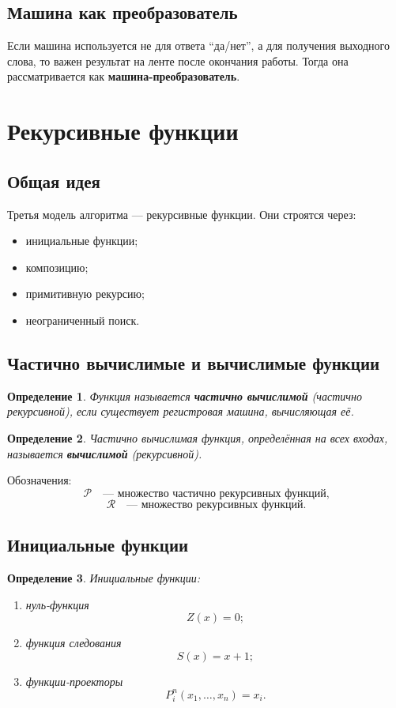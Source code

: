 \documentclass[12pt,a4paper]{article}
\newtheorem{definition}{Определение}
\begin{document}
\subsection{Машина как преобразователь}
Если машина используется не для ответа ``да/нет'', а для получения выходного слова, то важен результат на ленте после окончания работы. Тогда она рассматривается как \textbf{машина-преобразователь}.

\section{Рекурсивные функции}

\subsection{Общая идея}
Третья модель алгоритма --- рекурсивные функции. Они строятся через:
\begin{itemize}
    \item инициальные функции;
    \item композицию;
    \item примитивную рекурсию;
    \item неограниченный поиск.
\end{itemize}

\subsection{Частично вычислимые и вычислимые функции}
\begin{definition}
Функция называется \textbf{частично вычислимой} (частично рекурсивной), если существует регистровая машина, вычисляющая её.
\end{definition}

\begin{definition}
Частично вычислимая функция, определённая на всех входах, называется \textbf{вычислимой} (рекурсивной).
\end{definition}

Обозначения:
\[
\mathcal P \quad \text{--- множество частично рекурсивных функций,}
\]
\[
\mathcal R \quad \text{--- множество рекурсивных функций.}
\]

\subsection{Инициальные функции}
\begin{definition}
Инициальные функции:
\begin{enumerate}
    \item нуль-функция
    \[
    Z(x)=0;
    \]
    \item функция следования
    \[
    S(x)=x+1;
    \]
    \item функции-проекторы
    \[
    P_i^n(x_1,\dots,x_n)=x_i.
    \]
\end{enumerate}
\end{definition}
\end{document}
